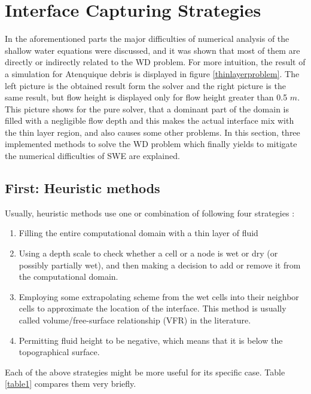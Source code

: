 \documentclass[letterpaper,10pt]{article}
\begin{document}
 

\section{Interface Capturing Strategies}\label{solution}
In the aforementioned parts the major difficulties of numerical analysis of the shallow water
equations were discussed, and it was shown that most of them are directly or indirectly related to the WD problem.
For more intuition, the result of a simulation for Atenquique debris is displayed in figure \ref{thinlayerproblem}. 
The left picture is the obtained result form the solver and the right picture is the same result, but flow height is displayed 
only for flow height greater than 0.5 $m$. This picture shows for the pure solver, that a dominant part of the 
domain is filled with a negligible flow depth and this makes the actual interface mix with the thin layer region, and 
also causes some other problems. In this section, three implemented methods to solve the WD problem which finally yields to 
mitigate the numerical difficulties of SWE are explained. 


\subsection{First: Heuristic methods} \label{Heuristic}
Usually, heuristic methods use one or combination of following four strategies \cite{Medeiros2013}: 
\begin{enumerate}
 
 \item Filling the entire computational domain with a thin layer of fluid
 \item Using a depth scale to check whether a cell or a node is wet or dry 
 (or possibly partially wet), and then  making a decision to add or remove it 
 from the computational domain.
 \item Employing some extrapolating scheme from the wet cells into their neighbor 
 cells to approximate the location of the interface. This method is usually called 
 volume/free-surface relationship (VFR) in the literature.
 \item Permitting fluid height to be negative, which means that it is below the topographical surface.
\end{enumerate}
Each of the above strategies might be more useful for its specific case. Table \ref{table1} compares them very briefly.
\end{document}
